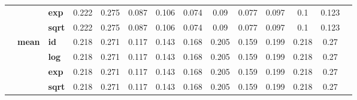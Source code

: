 \begin{table}[t]
{\begin{tabular}{cclccccccccccc}
    & & \textbf{exp} & 0.222 & 0.275 & 0.087 & 0.106 & 0.074 & 0.09 & 0.077 & 0.097 & 0.1 & 0.123 \\
    & & \textbf{sqrt} & 0.222 & 0.275 & 0.087 & 0.106 & 0.074 & 0.09 & 0.077 & 0.097 & 0.1 & 0.123 \\
\cmidrule{2-13}
& \multirow{4}{*}{\textbf{mean}}
      & \textbf{id} & 0.218 & 0.271 & 0.117 & 0.143 & 0.168 & 0.205 & 0.159 & 0.199 & 0.218 & 0.27 \\
    & & \textbf{log} & 0.218 & 0.271 & 0.117 & 0.143 & 0.168 & 0.205 & 0.159 & 0.199 & 0.218 & 0.27 \\
    & & \textbf{exp} & 0.218 & 0.271 & 0.117 & 0.143 & 0.168 & 0.205 & 0.159 & 0.199 & 0.218 & 0.27 \\
    & & \textbf{sqrt} & 0.218 & 0.271 & 0.117 & 0.143 & 0.168 & 0.205 & 0.159 & 0.199 & 0.218 & 0.27 \\
      \midrule


\end{tabular}}
\end{table}
